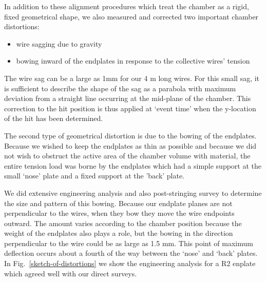 In addition to these alignment procedures which treat the chamber as a rigid, fixed
geometrical shape, we also measured and corrected two important chamber distortions:
\begin{itemize}
\item wire sagging due to gravity
\item bowing inward of the endplates in response to the collective wires' tension
\end{itemize}

The wire sag can be a large as 1mm for our 4 m long wires.  For this small
sag, it is sufficient to describe the shape of the sag as a parabola with
maximum deviation from a straight line occurring at the mid-plane of the chamber.
This correction to the hit position is thus applied at `event time' when 
the y-location of the hit has been determined.

The second type of geometrical distortion is due to the bowing of the endplates.
Because we wished to keep the endplates as thin as possible and because we did
not wish to obstruct the active area of the chamber volume with material, the
entire tension load was borne by the endplates which had a simple support at the
small `nose' plate and a fixed support at the 'back' plate.

We did extensive engineering analysis and also post-stringing survey to determine the
size and pattern of this bowing.  Because our endplate planes are not perpendicular to
the wires, when they bow they move the wire endpoints outward.  The amount varies
according to the chamber position because the weight of the endplates also plays a role,
but the bowing in the direction perpendicular to the wire could be as large as 1.5 mm.
This point of maximum deflection occurs about a fourth of the way between the `nose' and
`back' plates.  In Fig.~\ref{sketch-of-distortions} we show the engineering analysis
for a R2 enplate which agreed well with our direct surveys.

